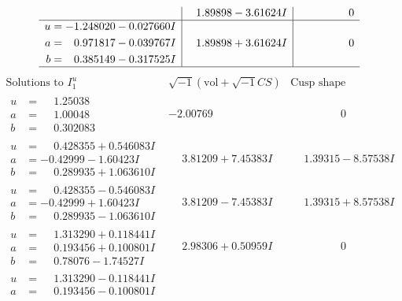 \documentclass[1p]{elsarticle_modified}
\theoremstyle{definition}
\newcommand{\I}{\sqrt{-1}}
\begin{document}
$$\begin{array}{c|c|c}
 & \phantom{-}1.89898 - 3.61624 I & \phantom{-0.000000 } 0 \\ \hline\begin{aligned}
u &= -1.248020 - 0.027660 I \\
a &= \phantom{-}0.971817 - 0.039767 I \\
b &= \phantom{-}0.385149 - 0.317525 I\end{aligned}
 & \phantom{-}1.89898 + 3.61624 I & \phantom{-0.000000 } 0\\
 \hline 
 \end{array}$$\newpage$$\begin{array}{c|c|c}  
\text{Solutions to }I^u_{1}& \I (\text{vol} + \sqrt{-1}CS) & \text{Cusp shape}\\
 \hline 
\begin{aligned}
u &= \phantom{-}1.25038\phantom{ +0.000000I} \\
a &= \phantom{-}1.00048\phantom{ +0.000000I} \\
b &= \phantom{-}0.302083\phantom{ +0.000000I}\end{aligned}
 & -2.00769\phantom{ +0.000000I} & \phantom{-0.000000 } 0 \\ \hline\begin{aligned}
u &= \phantom{-}0.428355 + 0.546083 I \\
a &= -0.42999 - 1.60423 I \\
b &= \phantom{-}0.289935 + 1.063610 I\end{aligned}
 & \phantom{-}3.81209 + 7.45383 I & \phantom{-}1.39315 - 8.57538 I \\ \hline\begin{aligned}
u &= \phantom{-}0.428355 - 0.546083 I \\
a &= -0.42999 + 1.60423 I \\
b &= \phantom{-}0.289935 - 1.063610 I\end{aligned}
 & \phantom{-}3.81209 - 7.45383 I & \phantom{-}1.39315 + 8.57538 I \\ \hline\begin{aligned}
u &= \phantom{-}1.313290 + 0.118441 I \\
a &= \phantom{-}0.193456 + 0.100801 I \\
b &= \phantom{-}0.78076 - 1.74527 I\end{aligned}
 & \phantom{-}2.98306 + 0.50959 I & \phantom{-0.000000 } 0 \\ \hline\begin{aligned}
u &= \phantom{-}1.313290 - 0.118441 I \\
a &= \phantom{-}0.193456 - 0.100801 I \\

\end{aligned}
\end{array}$$
\end{document}
